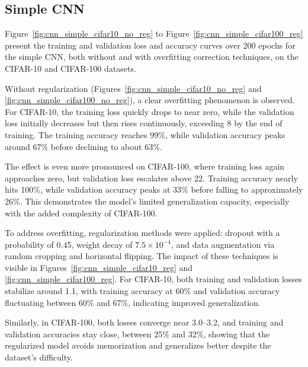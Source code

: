 \documentclass[journal,article,submit,pdftex,moreauthors]{Definitions/mdpi}
\begin{document}
\subsection{Simple CNN}

Figure~\ref{fig:cnn_simple_cifar10_no_reg} to Figure~\ref{fig:cnn_simple_cifar100_reg} present the training and validation loss and accuracy curves over 200 epochs for the simple CNN, both without and with overfitting correction techniques, on the CIFAR-10 and CIFAR-100 datasets.

Without regularization (Figures~\ref{fig:cnn_simple_cifar10_no_reg} and \ref{fig:cnn_simple_cifar100_no_reg}), a clear overfitting phenomenon is observed. For CIFAR-10, the training loss quickly drops to near zero, while the validation loss initially decreases but then rises continuously, exceeding 8 by the end of training. The training accuracy reaches 99\%, while validation accuracy peaks around 67\% before declining to about 63\%. 

The effect is even more pronounced on CIFAR-100, where training loss again approaches zero, but validation loss escalates above 22. Training accuracy nearly hits 100\%, while validation accuracy peaks at 33\% before falling to approximately 26\%. This demonstrates the model’s limited generalization capacity, especially with the added complexity of CIFAR-100.

To address overfitting, regularization methods were applied: dropout with a probability of 0.45, weight decay of $7.5 \times 10^{-4}$, and data augmentation via random cropping and horizontal flipping. The impact of these techniques is visible in Figures~\ref{fig:cnn_simple_cifar10_reg} and \ref{fig:cnn_simple_cifar100_reg}. For CIFAR-10, both training and validation losses stabilize around 1.1, with training accuracy at 60\% and validation accuracy fluctuating between 60\% and 67\%, indicating improved generalization.

Similarly, in CIFAR-100, both losses converge near 3.0–3.2, and training and validation accuracies stay close, between 25\% and 32\%, showing that the regularized model avoids memorization and generalizes better despite the dataset's difficulty.
\end{document}
